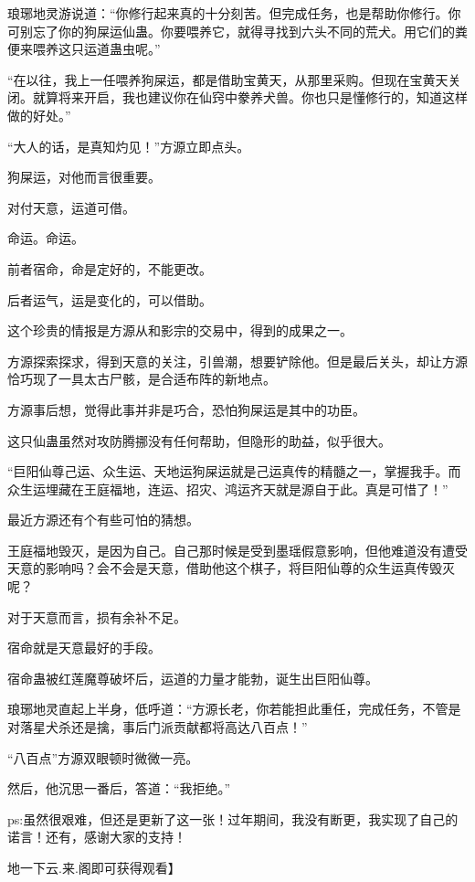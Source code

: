 \begin{this_body}
琅琊地灵游说道：“你修行起来真的十分刻苦。但完成任务，也是帮助你修行。你可别忘了你的狗屎运仙蛊。你要喂养它，就得寻找到六头不同的荒犬。用它们的粪便来喂养这只运道蛊虫呢。”

“在以往，我上一任喂养狗屎运，都是借助宝黄天，从那里采购。但现在宝黄天关闭。就算将来开启，我也建议你在仙窍中豢养犬兽。你也只是懂修行的，知道这样做的好处。”

“大人的话，是真知灼见！”方源立即点头。

狗屎运，对他而言很重要。

对付天意，运道可借。

命运。命运。

前者宿命，命是定好的，不能更改。

后者运气，运是变化的，可以借助。

这个珍贵的情报是方源从和影宗的交易中，得到的成果之一。

方源探索探求，得到天意的关注，引兽潮，想要铲除他。但是最后关头，却让方源恰巧现了一具太古尸骸，是合适布阵的新地点。

方源事后想，觉得此事并非是巧合，恐怕狗屎运是其中的功臣。

这只仙蛊虽然对攻防腾挪没有任何帮助，但隐形的助益，似乎很大。

“巨阳仙尊己运、众生运、天地运狗屎运就是己运真传的精髓之一，掌握我手。而众生运埋藏在王庭福地，连运、招灾、鸿运齐天就是源自于此。真是可惜了！”

最近方源还有个有些可怕的猜想。

王庭福地毁灭，是因为自己。自己那时候是受到墨瑶假意影响，但他难道没有遭受天意的影响吗？会不会是天意，借助他这个棋子，将巨阳仙尊的众生运真传毁灭呢？

对于天意而言，损有余补不足。

宿命就是天意最好的手段。

宿命蛊被红莲魔尊破坏后，运道的力量才能勃，诞生出巨阳仙尊。

琅琊地灵直起上半身，低呼道：“方源长老，你若能担此重任，完成任务，不管是对落星犬杀还是擒，事后门派贡献都将高达八百点！”

“八百点”方源双眼顿时微微一亮。

然后，他沉思一番后，答道：“我拒绝。”

ps:虽然很艰难，但还是更新了这一张！过年期间，我没有断更，我实现了自己的诺言！还有，感谢大家的支持！

地一下云.来.阁即可获得观看】

\end{this_body}

